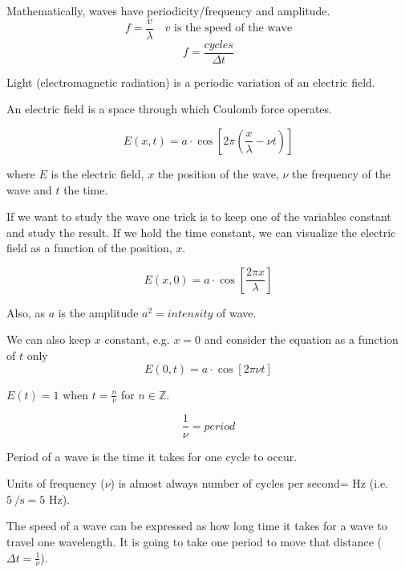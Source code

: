 \documentclass[../mit-general-chemistry.tex]{subfiles}
\begin{document}
Mathematically, waves have periodicity/frequency and amplitude.
\begin{equation}
  f = \frac{v}{\lambda}\quad v \text{~is the speed of the wave}
\end{equation}
\begin{equation}
  f = \frac{cycles}{\Delta t}
\end{equation}


Light (electromagnetic radiation) is a periodic variation of an
electric field.

An electric field is a space through which Coulomb force operates.


\begin{equation}
  E(x, t) = a\cdot\cos \left[ 2\pi \left( \frac{x}{\lambda} - \nu t \right) \right]
\end{equation}

where $E$ is the electric field, $x$ the position of the wave, $\nu$
the frequency of the wave and $t$ the time.

If we want to study the wave one trick is to keep one of the variables
constant and study the result. If we hold the time constant, we can
visualize the electric field as a function of the position, $x$.

\begin{equation}
  E(x, 0) = a\cdot\cos \left[ \frac{2\pi x}{\lambda}  \right]
\end{equation}

Also, as $a$ is the amplitude $a^2 = intensity$ of wave.



We can also keep $x$ constant, e.g. $x = 0$ and consider the equation
as a function of $t$ only 
\begin{equation}
  E(0, t) = a\cdot\cos \left[ 2\pi\nu t \right]
\end{equation}

$E(t) = 1$ when $t = \frac{n}{\nu}$ for $n\in\mathbb{Z}$.

\begin{equation}
  \frac{1}{\nu} = period
\end{equation}

Period of a wave is the time it takes for one cycle to occur.

Units of frequency ($\nu$) is almost always number of cycles per
second= Hz (i.e. $\SI{5}{\per\second} = 5$ Hz).

The speed of a wave can be expressed as how long time it takes for a
wave to travel one wavelength. It is going to take one period to move
that distance ($\Delta t = \frac{1}{\nu}$).
\end{document}
